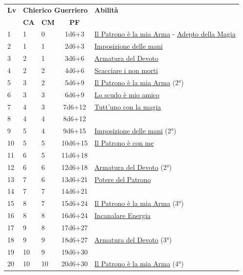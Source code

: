 {\begin{multicols}{2}


\noindent\begin{tabularx}{\linewidth}{p{0.3cm}|p{0.3cm}p{0.3cm}c|X|}
	\toprule
\rowcolor{gray!20}	\textbf{Lv} & \multicolumn{3}{c|}{\textbf{Chierico Guerriero}} & \textbf{Abilità} \\
 & \centering\arraybackslash \textbf{CA} & \centering\arraybackslash \textbf{CM} & \centering\arraybackslash \textbf{PF} & \\
	\toprule
	1 &1	& 0	&	1d6+3	&\hyperlink{Il Patrono è la mia Arma}{Il Patrono è la mia Arma} - \hyperlink{Adepto della Magia}{Adepto della Magia}\\
 \rowcolor{gray!20}2	&	1	& 1	&	2d6+3	&\hyperlink{Imposizione delle mani}{Imposizione delle mani}\\
	3	&	2	& 1	&	3d6+6	&\hyperlink{Armatura del Devoto}{Armatura del Devoto}\\
 \rowcolor{gray!20}4	&	2	& 2	&	4d6+6	&\hyperlink{Scacciare i non morti}{Scacciare i non morti}\\
	5	&	3	& 2	&	5d6+9	&\hyperlink{Il Patrono è la mia Arma}{Il Patrono è la mia Arma} (2°)\\
 \rowcolor{gray!20}6	&	3	& 3	&	6d6+9	&\hyperlink{Lo scudo è mio amico}{Lo scudo è mio amico}\\
	7	&	4	& 3	&	7d6+12	&\hyperlink{Tutt'uno con la magia}{Tutt'uno con la magia}\\
 \rowcolor{gray!20}8	&	4	& 4	&	8d6+12	&\\
	9	&	5	& 4	&	9d6+15	&\hyperlink{Imposizione delle mani}{Imposizione delle mani} (2°)\\
 \rowcolor{gray!20}10	&	5	& 5	&	10d6+15	&\hyperlink{Il Patrono è con me}{Il Patrono è con me}\\
	11	&	6	& 5	&	11d6+18	&\\
 \rowcolor{gray!20}12	&	6	& 6	&	12d6+18	&\hyperlink{Armatura del Devoto}{Armatura del Devoto} (2°)\\
	13	&	7	& 6	&	13d6+21	&\hyperlink{Potere del Patrono}{Potere del Patrono}\\
 \rowcolor{gray!20}14	&	7	& 7	&	14d6+21	&\\
	15	&	8	& 7	&	15d6+24	&\hyperlink{Il Patrono è la mia Arma}{Il Patrono è la mia Arma} (3°)\\
 \rowcolor{gray!20}16	&	8	& 8	&	16d6+24	&\hyperlink{Incanalare Energia}{Incanalare Energia}\\
	17	&	9	& 8	&	17d6+27	&\\
 \rowcolor{gray!20}18	&	9	& 9	&	18d6+27	&\hyperlink{Armatura del Devoto}{Armatura del Devoto} (3°)\\
	19	&	10	& 9	&	19d6+30	&\\
 \rowcolor{gray!20}20	&	10	& 10	&	20d6+30	&\hyperlink{Il Patrono è la mia Arma}{Il Patrono è la mia Arma} (4°)\\
\end{tabularx}


\end{multicols}}
